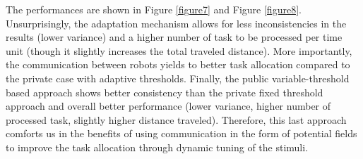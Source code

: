 The performances are shown in Figure \ref{figure7} and Figure \ref{figure8}. Unsurprisingly, the adaptation mechanism allows for less inconsistencies in the results (lower variance) and a higher number of task to be processed per time unit (though it slightly increases the total traveled distance). More importantly, the communication between robots yields to better task allocation compared to the private case with adaptive thresholds. Finally, the public variable-threshold based approach shows better consistency than the private fixed threshold approach and overall better performance (lower variance, higher number of processed task, slightly higher distance traveled). Therefore, this last approach comforts us in the benefits of using communication in the form of potential fields to improve the task allocation through dynamic tuning of the stimuli.

